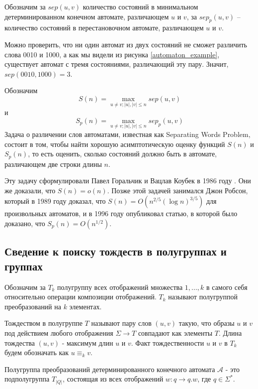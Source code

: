 Обозначим за $sep(u, v)$ количество состояний в минимальном детерминированном конечном автомате, различающем $u$ и $v$, за $sep_p(u, v)$ – количество состояний в перестановочном автомате, различающем $u$ и $v$.

\begin{example}
	Можно проверить, что ни один автомат из двух состояний не сможет различить слова 0010 и 1000, а как мы видели из рисунка \ref{automaton_example}, существует автомат с тремя состояниями, различающий эту пару. Значит, $sep(0010, 1000) = 3$.
\end{example}

Обозначим
$$
	S(n) = \max_{u \ne v; |u|, |v| \le n} sep(u, v)
$$ 
и
$$
	S_p(n) = \max_{u \ne v; |u|, |v| \le n} sep_p(u, v)
$$
Задача о различении слов автоматами, известная как Separating Words Problem, состоит в том, чтобы найти хорошую асимптотическую оценку функций $S(n)$ и $S_p(n)$, то есть оценить, сколько состояний должно быть в автомате, различающем две строки длины $n$.

Эту задачу сформулировали Павел Горальчик и Вацлав Коубек в 1986 году \cite{on discerning, remarks on separating}. Они же доказали, что $S(n) = o(n)$. Позже этой задачей занимался Джон Робсон, который в 1989 году \cite{robson 1989} доказал, что $S(n) = O(n^{2/5}(\log n)^{3/5})$ для произвольных автоматов, и в 1996 году \cite{robson 1996} опубликовал статью, в которой было доказано, что $S_p(n) = O(n^{1/2})$.

\subsection{Сведение к поиску тождеств в полугруппах и группах}

Обозначим за $T_k$ полугруппу всех отображений множества ${1, ..., k}$ в самого себя относительно операции композиции отображений. $T_k$ называют полугруппой преобразований на $k$ элементах.
\begin{definition}
	Тождеством в полугруппе $T$ называют пару слов $(u, v)$ такую, что образы $u$ и $v$ под действием любого отображения $\Sigma \rightarrow T$ совпадают как элементы $T$. Длина тождества $(u, v)$ - максимум длин $u$ и $v$. Факт тождественности $u$ и $v$ в $T_k$ будем обозначать как $u \equiv_k v$.
\end{definition}

\begin{definition}
	Полугруппа преобразований детерминированного конечного автомата $\mathscr{A}$ - это подполугруппа $T_{|Q|}$, состоящая из всех отображений $w: q \rightarrow q.w$, где $q \in \Sigma^*$.
\end{definition}

